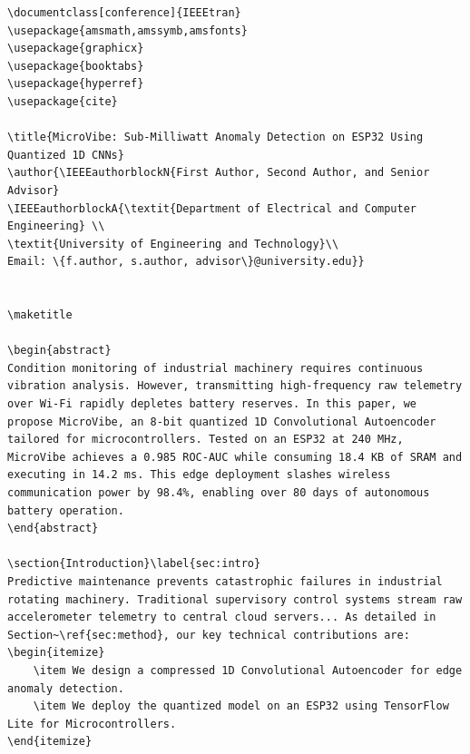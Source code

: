 \begin{lstlisting}[style=pythonstyle, caption={Complete Minimal \LaTeX{} Template for an Experimental TinyML Paper.}, label={lst:minimal_paper_tex}]
\documentclass[conference]{IEEEtran}
\usepackage{amsmath,amssymb,amsfonts}
\usepackage{graphicx}
\usepackage{booktabs}
\usepackage{hyperref}
\usepackage{cite}

\title{MicroVibe: Sub-Milliwatt Anomaly Detection on ESP32 Using Quantized 1D CNNs}
\author{\IEEEauthorblockN{First Author, Second Author, and Senior Advisor}
\IEEEauthorblockA{\textit{Department of Electrical and Computer Engineering} \\
\textit{University of Engineering and Technology}\\
Email: \{f.author, s.author, advisor\}@university.edu}}


\maketitle

\begin{abstract}
Condition monitoring of industrial machinery requires continuous vibration analysis. However, transmitting high-frequency raw telemetry over Wi-Fi rapidly depletes battery reserves. In this paper, we propose MicroVibe, an 8-bit quantized 1D Convolutional Autoencoder tailored for microcontrollers. Tested on an ESP32 at 240 MHz, MicroVibe achieves a 0.985 ROC-AUC while consuming 18.4 KB of SRAM and executing in 14.2 ms. This edge deployment slashes wireless communication power by 98.4%, enabling over 80 days of autonomous battery operation.
\end{abstract}

\section{Introduction}\label{sec:intro}
Predictive maintenance prevents catastrophic failures in industrial rotating machinery. Traditional supervisory control systems stream raw accelerometer telemetry to central cloud servers... As detailed in Section~\ref{sec:method}, our key technical contributions are:
\begin{itemize}
    \item We design a compressed 1D Convolutional Autoencoder for edge anomaly detection.
    \item We deploy the quantized model on an ESP32 using TensorFlow Lite for Microcontrollers.
\end{itemize}


\end{lstlisting}
